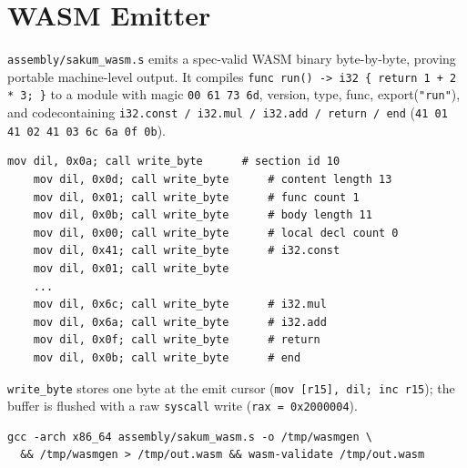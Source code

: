 \section{WASM Emitter}\label{ch:wasm}

\texttt{assembly/sakum\_wasm.s} emits a spec-valid WASM binary
byte-by-byte, proving portable machine-level output.  It compiles
\texttt{func run() -> i32 \{ return 1 + 2 * 3; \}} to a module with magic
\texttt{00 61 73 6d}, version, type\textsection, func\textsection,
export\textsection(\texttt{"run"}), and code\textsection containing
\texttt{i32.const / i32.mul / i32.add / return / end}
(\texttt{41 01 41 02 41 03 6c 6a 0f 0b}).

\begin{lstlisting}[language=SakumAsm,caption={Code-section emit (sakum\_wasm.s:79).}]
    mov dil, 0x0a; call write_byte      # section id 10
    mov dil, 0x0d; call write_byte      # content length 13
    mov dil, 0x01; call write_byte      # func count 1
    mov dil, 0x0b; call write_byte      # body length 11
    mov dil, 0x00; call write_byte      # local decl count 0
    mov dil, 0x41; call write_byte      # i32.const
    mov dil, 0x01; call write_byte
    ...
    mov dil, 0x6c; call write_byte      # i32.mul
    mov dil, 0x6a; call write_byte      # i32.add
    mov dil, 0x0f; call write_byte      # return
    mov dil, 0x0b; call write_byte      # end
\end{lstlisting}

\noindent \texttt{write\_byte} stores one byte at the emit cursor
(\texttt{mov [r15], dil; inc r15}); the buffer is flushed with a raw
\texttt{syscall} write (\texttt{rax = 0x2000004}).

\begin{verbatim}
gcc -arch x86_64 assembly/sakum_wasm.s -o /tmp/wasmgen \
  && /tmp/wasmgen > /tmp/out.wasm && wasm-validate /tmp/out.wasm
\end{verbatim}
